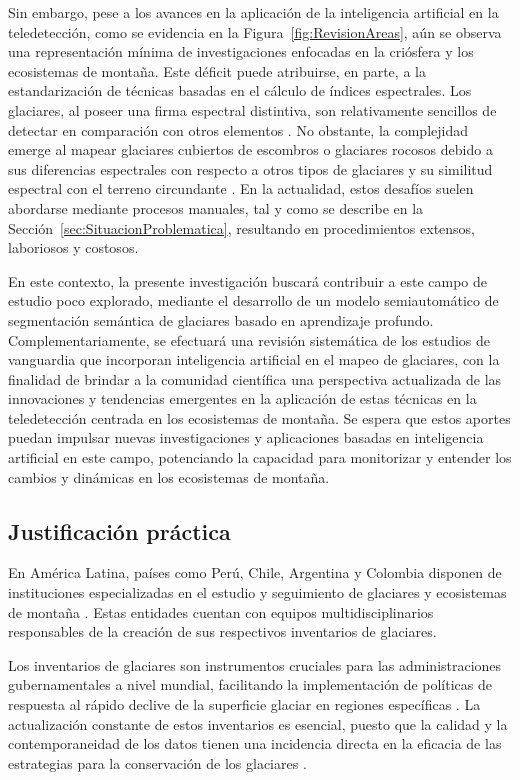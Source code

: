 Sin embargo, pese a los avances en la aplicación de la inteligencia artificial en la teledetección, como se evidencia en la Figura~\ref{fig:RevisionAreas}, aún se observa una representación mínima de investigaciones enfocadas en la criósfera y los ecosistemas de montaña. Este déficit puede atribuirse, en parte, a la estandarización de técnicas basadas en el cálculo de índices espectrales. Los glaciares, al poseer una firma espectral distintiva, son relativamente sencillos de detectar en comparación con otros elementos \cite{dietz2012remote}. No obstante, la complejidad emerge al mapear glaciares cubiertos de escombros o glaciares rocosos debido a sus diferencias espectrales con respecto a otros tipos de glaciares y su similitud espectral con el terreno circundante \cite{nijhawan2018hybrid}. En la actualidad, estos desafíos suelen abordarse mediante procesos manuales, tal y como se describe en la Sección~\ref{sec:SituacionProblematica}, resultando en procedimientos extensos, laboriosos y costosos.

En este contexto, la presente investigación buscará contribuir a este campo de estudio poco explorado, mediante el desarrollo de un modelo semiautomático de segmentación semántica de glaciares basado en aprendizaje profundo. Complementariamente, se efectuará una revisión sistemática de los estudios de vanguardia que incorporan inteligencia artificial en el mapeo de glaciares, con la finalidad de brindar a la comunidad científica una perspectiva actualizada de las innovaciones y tendencias emergentes en la aplicación de estas técnicas en la teledetección centrada en los ecosistemas de montaña. Se espera que estos aportes puedan impulsar nuevas investigaciones y aplicaciones basadas en inteligencia artificial en este campo, potenciando la capacidad para monitorizar y entender los cambios y dinámicas en los ecosistemas de montaña.

\subsection{Justificación práctica}

En América Latina, países como Perú, Chile, Argentina y Colombia disponen de instituciones especializadas en el estudio y seguimiento de glaciares y ecosistemas de montaña \cite{inaigem2017manual, DGA2022, castro2014manual, ospina2022metodologia}. Estas entidades cuentan con equipos multidisciplinarios responsables de la creación de sus respectivos inventarios de glaciares.

Los inventarios de glaciares son instrumentos cruciales para las administraciones gubernamentales a nivel mundial, facilitando la implementación de políticas de respuesta al rápido declive de la superficie glaciar en regiones específicas \cite{barella2022combined}. La actualización constante de estos inventarios es esencial, puesto que la calidad y la contemporaneidad de los datos tienen una incidencia directa en la eficacia de las estrategias para la conservación de los glaciares \cite{alifu2020machine, lu2021novel, xie2022progressive}.

